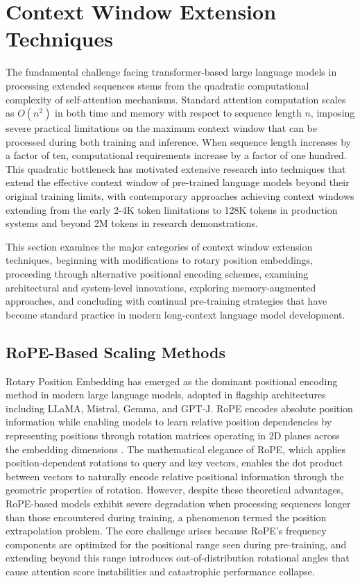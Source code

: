 \documentclass[11pt,letterpaper]{article}
\begin{document}
\section{Context Window Extension Techniques}
\label{sec:extension}

The fundamental challenge facing transformer-based large language models in processing extended sequences stems from the quadratic computational complexity of self-attention mechanisms. Standard attention computation scales as $O(n^2)$ in both time and memory with respect to sequence length $n$, imposing severe practical limitations on the maximum context window that can be processed during both training and inference. When sequence length increases by a factor of ten, computational requirements increase by a factor of one hundred. This quadratic bottleneck has motivated extensive research into techniques that extend the effective context window of pre-trained language models beyond their original training limits, with contemporary approaches achieving context windows extending from the early 2-4K token limitations to 128K tokens in production systems and beyond 2M tokens in research demonstrations.

This section examines the major categories of context window extension techniques, beginning with modifications to rotary position embeddings, proceeding through alternative positional encoding schemes, examining architectural and system-level innovations, exploring memory-augmented approaches, and concluding with continual pre-training strategies that have become standard practice in modern long-context language model development.

\subsection{RoPE-Based Scaling Methods}

Rotary Position Embedding has emerged as the dominant positional encoding method in modern large language models, adopted in flagship architectures including LLaMA, Mistral, Gemma, and GPT-J. RoPE encodes absolute position information while enabling models to learn relative position dependencies by representing positions through rotation matrices operating in 2D planes across the embedding dimensions \cite{su2024roformer}. The mathematical elegance of RoPE, which applies position-dependent rotations to query and key vectors, enables the dot product between vectors to naturally encode relative positional information through the geometric properties of rotation. However, despite these theoretical advantages, RoPE-based models exhibit severe degradation when processing sequences longer than those encountered during training, a phenomenon termed the position extrapolation problem. The core challenge arises because RoPE's frequency components are optimized for the positional range seen during pre-training, and extending beyond this range introduces out-of-distribution rotational angles that cause attention score instabilities and catastrophic performance collapse.
\end{document}
